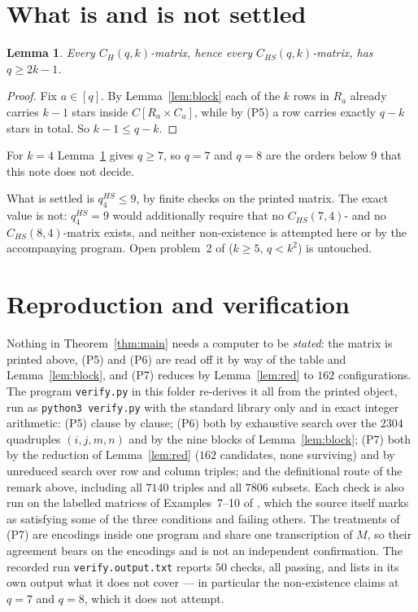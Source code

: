 \documentclass[11pt]{amsart}
\newtheorem{lemma}[theorem]{Lemma}
\theoremstyle{definition}
\theoremstyle{remark}
\begin{document}
\section{What is and is not settled}

\begin{lemma}\label{lem:2k}
Every $C_H(q,k)$-matrix, hence every $C_{HS}(q,k)$-matrix, has $q\ge2k-1$.
\end{lemma}

\begin{proof}
Fix $a\in[q]$. By Lemma~\ref{lem:block} each of the $k$ rows in $R_a$ already
carries $k-1$ stars inside $C[R_a\times C_a]$, while by (P5) a row carries
exactly $q-k$ stars in total. So $k-1\le q-k$.
\end{proof}

For $k=4$ Lemma~\ref{lem:2k} gives $q\ge7$, so $q=7$ and $q=8$ are the orders
below $9$ that this note does not decide.

What is settled is $q_4^{HS}\le9$, by finite checks on the printed matrix. The
exact value is not: $q_4^{HS}=9$ would additionally require that no
$C_{HS}(7,4)$- and no $C_{HS}(8,4)$-matrix exists, and neither non-existence is
attempted here or by the accompanying program. Open problem~2 of \cite{Dya}
($k\ge5$, $q<k^2$) is untouched.

\section{Reproduction and verification}\label{sec:repro}

Nothing in Theorem~\ref{thm:main} needs a computer to be \emph{stated}: the
matrix is printed above, (P5) and (P6) are read off it by way of the table and
Lemma~\ref{lem:block}, and (P7) reduces by Lemma~\ref{lem:red} to $162$
configurations. The program \texttt{verify.py} in this folder re-derives it all
from the printed object, run as \texttt{python3\ verify.py} with the standard
library only and in
exact integer arithmetic: (P5) clause by clause; (P6) both by exhaustive search
over the $2304$ quadruples $(i,j,m,n)$ and by the nine blocks of
Lemma~\ref{lem:block}; (P7) both by the reduction of Lemma~\ref{lem:red} ($162$
candidates, none surviving) and by unreduced search over row and column triples;
and the definitional route of the remark above, including all $7140$ triples and
all $7806$ subsets. Each check is also run on the labelled matrices of
Examples~7--10 of \cite{Dya}, which the source itself marks as satisfying some
of the three conditions and failing others. The treatments of (P7) are encodings
inside one program and share one transcription of $M$, so their agreement bears
on the encodings and is not an independent confirmation. The recorded run
\texttt{verify.output.txt} reports $50$ checks, all passing, and lists in its
own output what it does not cover --- in particular the non-existence claims at
$q=7$ and $q=8$, which it does not attempt.
\end{document}
